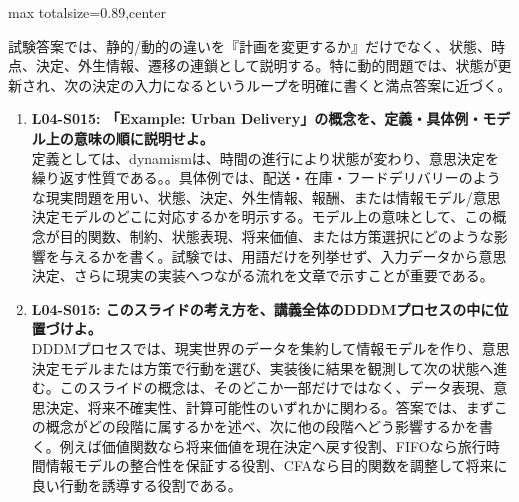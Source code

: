 \begin{minipage}[t]{0.58\textwidth}
\begin{adjustbox}{max totalsize={\textwidth}{0.89\textheight},center}
\begin{minipage}{\textwidth}
試験答案では、静的/動的の違いを『計画を変更するか』だけでなく、状態、時点、決定、外生情報、遷移の連鎖として説明する。特に動的問題では、状態が更新され、次の決定の入力になるというループを明確に書くと満点答案に近づく。\par{}\begin{enumerate}\item \textbf{L04-S015: 「Example: Urban Delivery」の概念を、定義・具体例・モデル上の意味の順に説明せよ。}\\定義としては、dynamismは、時間の進行により状態が変わり、意思決定を繰り返す性質である。。具体例では、配送・在庫・フードデリバリーのような現実問題を用い、状態、決定、外生情報、報酬、または情報モデル/意思決定モデルのどこに対応するかを明示する。モデル上の意味として、この概念が目的関数、制約、状態表現、将来価値、または方策選択にどのような影響を与えるかを書く。試験では、用語だけを列挙せず、入力データから意思決定、さらに現実の実装へつながる流れを文章で示すことが重要である。\item \textbf{L04-S015: このスライドの考え方を、講義全体のDDDMプロセスの中に位置づけよ。}\\DDDMプロセスでは、現実世界のデータを集約して情報モデルを作り、意思決定モデルまたは方策で行動を選び、実装後に結果を観測して次の状態へ進む。このスライドの概念は、そのどこか一部だけではなく、データ表現、意思決定、将来不確実性、計算可能性のいずれかに関わる。答案では、まずこの概念がどの段階に属するかを述べ、次に他の段階へどう影響するかを書く。例えば価値関数なら将来価値を現在決定へ戻す役割、FIFOなら旅行時間情報モデルの整合性を保証する役割、CFAなら目的関数を調整して将来に良い行動を誘導する役割である。\end{enumerate}
\end{minipage}
\end{adjustbox}
\end{minipage}


